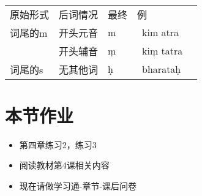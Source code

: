 \documentclass[17pt]{beamer}
\newcommand{\skt}[1]{{\sanskritfont{#1}}} %
\newcommand{\fullpada}[1]{\textcolor{OliveGreen}{#1}}
\newcommand{\sktpada}[1]{{\textcolor{OliveGreen}{\skt{#1}}}}
\newcommand{\skttranspada}[1]{{\sktpada{#1}~\fullpada{#1}}}
\begin{document}
\begin{frame}{\insertsection  ~~\insertsubsection }
  \small
  \centering
  \begin{tabular}{@{}lllll@{}} %
    原始形式 & 后词情况 & 最终 & 例 \\[0.2cm]
    词尾的m & 开头元音 & m & \skttranspada{kim atra}  \\
      &  开头辅音 & ṃ & \skttranspada{kiṃ tatra} \\[0.2cm]
        词尾的s & 无其他词 & ḥ & \skttranspada{bharataḥ}  \\
  \end{tabular} 
\end{frame}


\section{本节作业}

\begin{frame}{\insertsection }
  \begin{itemize}
    \item
      第四章练习2，练习3
    \item
      阅读教材第4课相关内容
    \bigskip
    \item
      现在请做学习通\nobreakdash-章节\nobreakdash-课后问卷
  \end{itemize}
\end{frame}  
\end{document}
